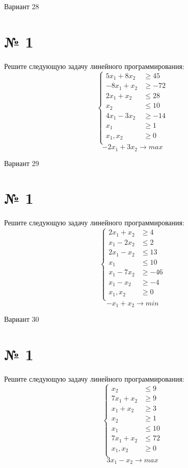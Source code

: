\documentclass{article}%
\begin{document}
%
\newpage%
\begin{center}%
\begin{Huge}%
Вариант 28%
\end{Huge}%
\end{center}%
\section*{№ 1}%
\label{sec:1}%
Решите следующую задачу линейного программирования: %
\[%
\left\{\begin{aligned}5x_{1}+8x_{2} & \ge45 \\-8x_{1}+x_{2} & \ge-72 \\2x_{1}+x_{2} & \le28 \\x_{2} & \le10 \\4x_{1}-3x_{2} & \ge-14 \\x_{1} & \ge1 \\x_{1},x_{2} & \ge 0 \\\end{aligned}\right.%
\]%
\[%
-2x_{1}+3x_{2}  \to max%
\]

%
\newpage%
\begin{center}%
\begin{Huge}%
Вариант 29%
\end{Huge}%
\end{center}%
\section*{№ 1}%
\label{sec:1}%
Решите следующую задачу линейного программирования: %
\[%
\left\{\begin{aligned}2x_{1}+x_{2} & \ge4 \\x_{1}-2x_{2} & \le2 \\2x_{1}-x_{2} & \le13 \\x_{1} & \le10 \\x_{1}-7x_{2} & \ge-46 \\x_{1}-x_{2} & \ge-4 \\x_{1},x_{2} & \ge 0 \\\end{aligned}\right.%
\]%
\[%
-x_{1}+x_{2}  \to min%
\]

%
\newpage%
\begin{center}%
\begin{Huge}%
Вариант 30%
\end{Huge}%
\end{center}%
\section*{№ 1}%
\label{sec:1}%
Решите следующую задачу линейного программирования: %
\[%
\left\{\begin{aligned}x_{2} & \le9 \\7x_{1}+x_{2} & \ge9 \\x_{1}+x_{2} & \ge3 \\x_{2} & \ge1 \\x_{1} & \le10 \\7x_{1}+x_{2} & \le72 \\x_{1},x_{2} & \ge 0 \\\end{aligned}\right.%
\]%
\[%
3x_{1}-x_{2}  \to max%
\]

%
\newpage%
\end{document}
